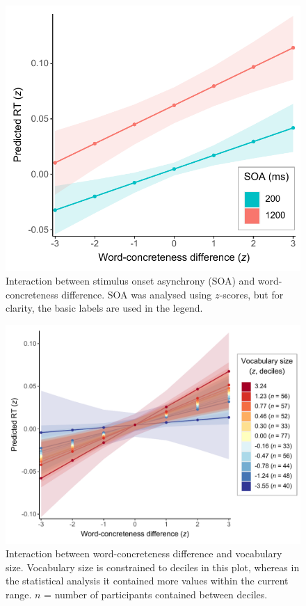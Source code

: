 \documentclass[
  12pt,
  man,floatsintext]{apa7}
\begin{document}
\begin{figure}

{\centering \includegraphics[width=0.7\linewidth]{../semanticpriming/frequentist_analysis/plots/semanticpriming-interaction-word-concreteness-difference-SOA} 

}

\caption{Interaction between stimulus onset asynchrony (SOA) and word-concreteness difference. SOA was analysed using $z$-scores, but for clarity, the basic labels are used in the legend.}\label{fig:semanticpriming-interaction-word-concreteness-difference-SOA}
\end{figure}



\begin{figure}

{\centering \includegraphics[width=0.9\linewidth]{../semanticpriming/frequentist_analysis/plots/semanticpriming-interaction-word-concreteness-difference-vocabulary-size} 

}

\caption{Interaction between word-concreteness difference and vocabulary size. Vocabulary size is constrained to deciles in this plot, whereas in the statistical analysis it contained more values within the current range. \(n\) = number of participants contained between deciles.}\label{fig:semanticpriming-interaction-word-concreteness-difference-vocabulary-size}
\end{figure}
\end{document}
